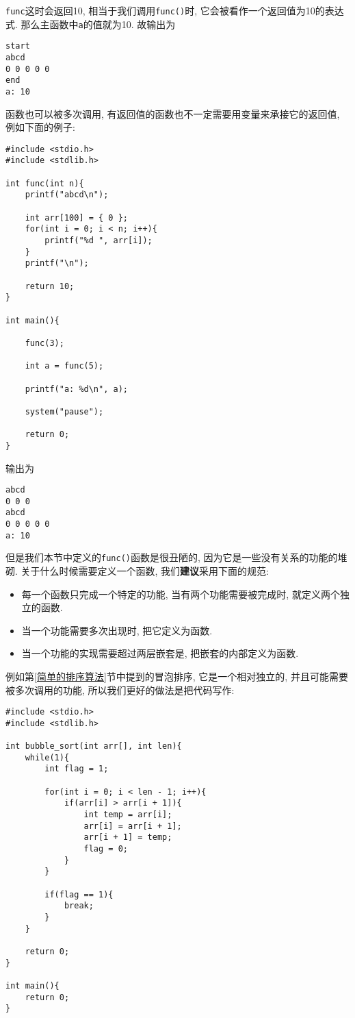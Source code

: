         \texttt{func}这时会返回10, 相当于我们调用\texttt{func()}时, 它会被看作一个返回值为10的表达式. 那么主函数中\texttt{a}的值就为10. 故输出为
\begin{lstlisting}
start
abcd
0 0 0 0 0
end
a: 10
\end{lstlisting}

        函数也可以被多次调用, 有返回值的函数也不一定需要用变量来承接它的返回值, 例如下面的例子:
\begin{lstlisting}
#include <stdio.h>
#include <stdlib.h>

int func(int n){
    printf("abcd\n");

    int arr[100] = { 0 };
    for(int i = 0; i < n; i++){
        printf("%d ", arr[i]);
    }
    printf("\n");

    return 10;
}

int main(){

    func(3);

    int a = func(5);

    printf("a: %d\n", a);

    system("pause");

    return 0;
}
\end{lstlisting}

        输出为
\begin{lstlisting}
abcd
0 0 0
abcd
0 0 0 0 0
a: 10
\end{lstlisting}

        但是我们本节中定义的\texttt{func()}函数是很丑陋的, 因为它是一些没有关系的功能的堆砌. 关于什么时候需要定义一个函数, 我们\textbf{建议}采用下面的规范:
        \begin{itemize}
            \item 每一个函数只完成一个特定的功能, 当有两个功能需要被完成时, 就定义两个独立的函数.
            \item 当一个功能需要多次出现时, 把它定义为函数.
            \item 当一个功能的实现需要超过两层嵌套是, 把嵌套的内部定义为函数.
        \end{itemize}

        例如第\ref{简单的排序算法}节中提到的冒泡排序, 它是一个相对独立的, 并且可能需要被多次调用的功能, 所以我们更好的做法是把代码写作:
\begin{lstlisting}
#include <stdio.h>
#include <stdlib.h>

int bubble_sort(int arr[], int len){
    while(1){
        int flag = 1;

        for(int i = 0; i < len - 1; i++){
            if(arr[i] > arr[i + 1]){
                int temp = arr[i];
                arr[i] = arr[i + 1];
                arr[i + 1] = temp;
                flag = 0;
            }
        }

        if(flag == 1){
            break;
        }
    }

    return 0;
}

int main(){
    return 0;
}
\end{lstlisting}

